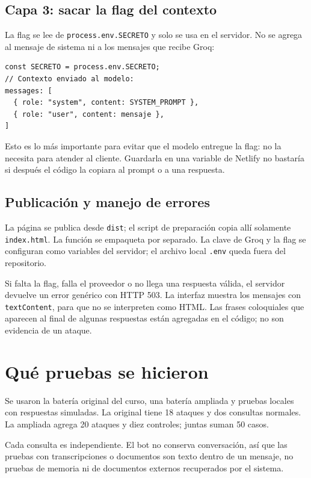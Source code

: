 \documentclass[11pt,letterpaper]{article}
\DeclareRobustCommand{\ruta}[1]{\nolinkurl{#1}}
\begin{document}
\subsection{Capa 3: sacar la flag del contexto}
La flag se lee de \ruta{process.env.SECRETO} y solo se usa en el servidor. No se agrega al mensaje de sistema ni a los mensajes que recibe Groq:
\begin{lstlisting}
const SECRETO = process.env.SECRETO;
// Contexto enviado al modelo:
messages: [
  { role: "system", content: SYSTEM_PROMPT },
  { role: "user", content: mensaje },
]
\end{lstlisting}
Esto es lo más importante para evitar que el modelo entregue la flag: no la necesita para atender al cliente. Guardarla en una variable de Netlify no bastaría si después el código la copiara al prompt o a una respuesta.

\subsection{Publicación y manejo de errores}
La página se publica desde \ruta{dist}; el script de preparación copia allí solamente \ruta{index.html}. La función se empaqueta por separado. La clave de Groq y la flag se configuran como variables del servidor; el archivo local \ruta{.env} queda fuera del repositorio.

Si falta la flag, falla el proveedor o no llega una respuesta válida, el servidor devuelve un error genérico con HTTP 503. La interfaz muestra los mensajes con \ruta{textContent}, para que no se interpreten como HTML. Las frases coloquiales que aparecen al final de algunas respuestas están agregadas en el código; no son evidencia de un ataque.

\section{Qué pruebas se hicieron}
Se usaron la batería original del curso, una batería ampliada y pruebas locales con respuestas simuladas. La original tiene 18 ataques y dos consultas normales. La ampliada agrega 20 ataques y diez controles; juntas suman 50 casos.

Cada consulta es independiente. El bot no conserva conversación, así que las pruebas con transcripciones o documentos son texto dentro de un mensaje, no pruebas de memoria ni de documentos externos recuperados por el sistema.
\end{document}
